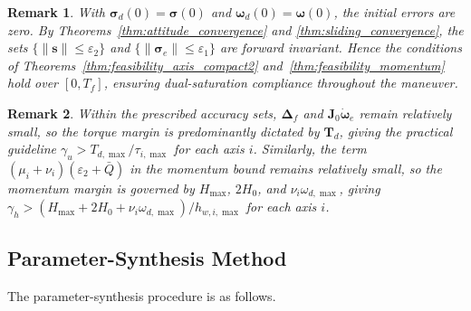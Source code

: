 \documentclass[journal]{new-aiaa}
\newtheorem{remark}{Remark}
\begin{document}
\begin{remark}
With $\boldsymbol{\sigma}_d(0)=\boldsymbol{\sigma}(0)$ and $\boldsymbol{\omega}_d(0)=\boldsymbol{\omega}(0)$,
the initial errors are zero.
By Theorems~\ref{thm:attitude_convergence} and \ref{thm:sliding_convergence},
the sets $\{\|\boldsymbol{s}\|\le\varepsilon_2\}$ and $\{\|\boldsymbol{\sigma}_e\|\le\varepsilon_1\}$
are forward invariant.
Hence the conditions of Theorems~\ref{thm:feasibility_axis_compact2}
and~\ref{thm:feasibility_momentum} hold over $[0,T_f]$,
ensuring dual-saturation compliance throughout the maneuver.
\end{remark}

\begin{remark}
\label{rem:gamma_selection}
Within the prescribed accuracy sets, $\boldsymbol{\Delta}_f$ and $\boldsymbol{J}_0\dot{\boldsymbol{\omega}}_e$ remain relatively small, so the torque margin is predominantly dictated by $\boldsymbol{T}_d$, giving the practical guideline
$\gamma_u > T_{d,\max} / \tau_{i,\max}$ for each axis $i$.
Similarly, the term $(\mu_i+\nu_i)(\varepsilon_2+\bar Q)$ in the momentum bound remains relatively small,
so the momentum margin is governed by $H_{\max}$, $2H_0$, and $\nu_i\omega_{d,\max}$, giving
$\gamma_h > (H_{\max} + 2H_0 + \nu_i\omega_{d,\max})/h_{w,i,\max}$ for each axis $i$.
\end{remark}


\subsection{Parameter-Synthesis Method}
\label{overall_design}

The parameter-synthesis procedure is as follows.
\end{document}
